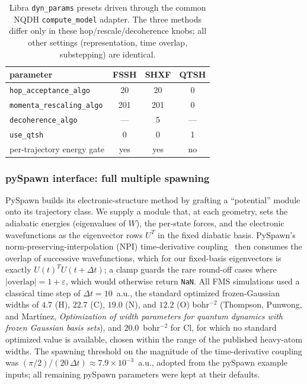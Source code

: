 \documentclass[11pt]{article}
\begin{document}
\begin{table}[ht]
  \centering
  \small
  \begin{tabular}{lccc}
    \toprule
    parameter & FSSH & SHXF & QTSH \\
    \midrule
    \texttt{hop\_acceptance\_algo}   & 20  & 20  & 0 \\
    \texttt{momenta\_rescaling\_algo}& 201 & 201 & 0 \\
    \texttt{decoherence\_algo}       & --- & 5   & --- \\
    \texttt{use\_qtsh}               & 0   & 0   & 1 \\
    per-trajectory energy gate       & yes & yes & no \\
    \bottomrule
  \end{tabular}
  \caption{Libra \texttt{dyn\_params} presets driven through the common NQDH
  \texttt{compute\_model} adapter. The three methods differ only in these
  hop/rescale/decoherence knobs; all other settings (representation, time
  overlap, substepping) are identical.}
  \label{tab:presets}
\end{table}

\subsubsection{pySpawn interface: full multiple spawning}
PySpawn builds its electronic-structure method by grafting a ``potential'' module onto its trajectory class. We supply a module that, at each geometry, sets the adiabatic energies (eigenvalues of $W$), the per-state forces, and the electronic wavefunctions as the eigenvector rows $U^{T}$ in the fixed diabatic basis. PySpawn's norm-preserving-interpolation (NPI) time-derivative coupling~\cite{meek2014evaluation} then consumes the overlap of successive wavefunctions, which for our fixed-basis eigenvectors is exactly $U(t)^{T}U(t{+}\Delta t)$; a clamp guards the rare round-off cases where $|\text{overlap}| = 1+\varepsilon$, which would otherwise return \texttt{NaN}. All FMS simulations used a classical time step of $\Delta t = 10$~a.u., the standard optimized frozen-Gaussian widths of $4.7$ (H), $22.7$ (C), $19.0$ (N), and $12.2$ (O) bohr$^{-2}$
(Thompson, Punwong, and Mart\'inez, \emph{Optimization of width parameters for quantum dynamics with frozen Gaussian basis sets}), and $20.0$~bohr$^{-2}$ for Cl, for which no standard optimized value is available, chosen within the range of the published heavy-atom widths. The spawning threshold on the magnitude of the time-derivative coupling was $(\pi/2)/(20\,\Delta t) \approx 7.9\times10^{-3}$~a.u., adopted from the pySpawn example inputs; all remaining pySpawn parameters were kept at their defaults.
\end{document}
